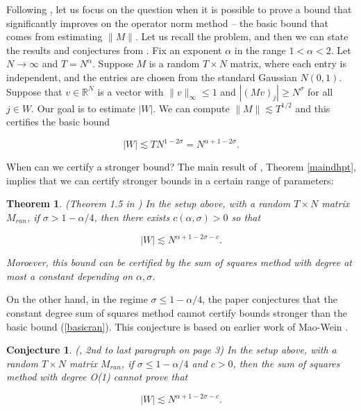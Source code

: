 \documentclass{amsart}
\newtheorem{theorem}[prop]{Theorem}
\newtheorem{conj}[prop]{Conjecture}
\newcommand{\RR}{\mathbb{R}}
\begin{document}
Following \cite{DHPT}, let us focus on the question when it is possible to prove a bound that significantly improves on the operator norm method -- the basic bound that comes from estimating $\| M \|$.  Let us recall the problem, and then we can state the results and conjectures from \cite{DHPT}.  Fix an exponent $\alpha$ in the range $1 < \alpha < 2$.  Let $N \rightarrow \infty$ and $T = N^\alpha$.  Suppose $M$ is a  random $T \times N$ matrix, where each entry is independent, and the entries are chosen from the standard Gaussian $N(0,1)$.    Suppose that $v \in \RR^N$ is a vector with $\| v \|_\infty \le 1$ and $| (Mv)_j | \ge N^\sigma$ for all $j \in W$.  Our goal is to estimate $|W|$.  We can compute $\| M \| \lesssim T^{1/2}$ and this certifies the basic bound

\begin{equation} \label{basicran}
 |W| \lesssim T N^{1 - 2 \sigma} = N^{\alpha + 1 - 2 \sigma}. \end{equation}

When can we certify a stronger bound?  The main result of \cite{DHPT},  Theorem \ref{maindhpt},  implies that we can certify stronger bounds in a certain range of parameters:

\begin{theorem} (Theorem 1.5 in \cite{DHPT}) In the setup above,  with a random $T \times N$ matrix $M_{ran}$,  if $\sigma > 1 - \alpha /4$,  then there exists $c(\alpha, \sigma) > 0$ so that

$$ |W| \lesssim N^{\alpha +1 - 2 \sigma - c}. $$

Moroever, this bound can be certified by the sum of squares method with degree at most a constant depending on $\alpha, \sigma$.  

\end{theorem}


On the other hand,  in the regime $\sigma \le 1 - \alpha / 4$,  the paper \cite{DHPT} conjectures that the constant degree sum of squares method cannot certify bounds stronger than the basic bound (\ref{basicran}).   This conjecture is based on earlier work of Mao-Wein \cite{MW}.

\begin{conj} \label{conjsos} (\cite{DHPT}, 2nd to last paragraph on page 3) In the setup above,  with a random $T \times N$ matrix $M_{ran}$,  if $\sigma \le 1 - \alpha/4$ and $c>0$,   then the sum of squares method with degree O(1) cannot prove that

$$ |W| \lesssim N^{\alpha + 1 - 2 \sigma-c}. $$

\end{conj}
\end{document}
